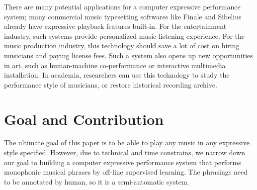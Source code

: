 
There are many potential applications for a computer expressive performance system; many commercial music typesetting softwares like Finale\cite{finale} and Sibelius\cite{sibelius} already have expressive playback features built-in. For the entertainment industry, such systems provide personalized music listening experience. For the music production industry, this technology should save a lot of cost on hiring musicians and paying license fees. Such a system also opens up new opportunities in art, such as human-machine co-performance or interactive multimedia installation. In academia, researchers can use this technology to study the performance style of musicians, or restore historical recording archive.


%



\section{Goal and Contribution}
The ultimate goal of this paper is to be able to play any music in any expressive style specified. However, due to technical and time constrains, we narrow down our goal to building a computer expressive performance system that performs monophonic musical phrases by off-line supervised learning. The phrasings need to be annotated by human, so it is a semi-automatic system.


